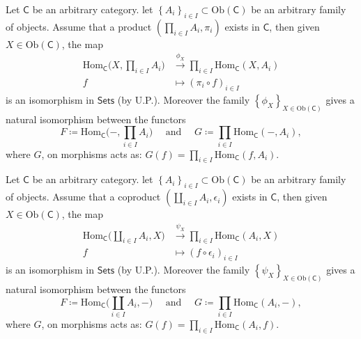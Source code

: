 \begin{prop}
	Let $\mathsf{C}$ be an arbitrary category.
	let $\left\{ A_i \right\}_{i \in I} \subset \mathrm{Ob} \left(\mathsf{C}\right)$ be an arbitrary family of objects.
	Assume that a product $\left(\prod_{i \in I}A_i, \pi_i\right)$ exists in $\mathsf{C}$, then
	given $X \in \mathrm{Ob} \left(\mathsf{C}\right)$, the map
	\begin{align}
		\mathrm{Hom}_{\mathsf{C}} \bigg( X, \prod_{i \in I}A_i \bigg)  &\xrightarrow{\phi_X} \prod_{i \in I} \mathrm{Hom}_{\mathsf{C}} \left( X, A_i \right) \\
		f &\mapsto \left( \pi_i \circ f \right)_{i \in I}
	\end{align} 
	is an isomorphism in $\mathsf{Sets}$ (by U.P.).
	Moreover the family $\left\{ \phi_X \right\}_{X \in \mathrm{Ob} \left(\mathsf{C}\right)}$ gives a natural isomorphism between the functors
	\begin{equation}
	F \coloneqq \mathrm{Hom}_{\mathsf{C}} \bigg( -, \prod_{i \in I} A_i \bigg) \quad \text{ and } \quad G\coloneqq \prod_{i \in I} \mathrm{Hom}_{\mathsf{C}} \left( -, A_i \right)
	,\end{equation} 
	where $G$, on morphisms acts as: $G(f) = \prod_{i \in I} \mathrm{Hom}_{\mathsf{C}} \left( f, A_i \right)$.
\end{prop} 

\begin{prop}
	Let $\mathsf{C}$ be an arbitrary category.
	let $\left\{ A_i \right\}_{i \in I} \subset \mathrm{Ob} \left(\mathsf{C}\right)$ be an arbitrary family of objects.
	Assume that a coproduct $\left(\coprod_{i \in I}A_i, \epsilon_i\right)$ exists in $\mathsf{C}$, then
	given $X \in \mathrm{Ob} \left(\mathsf{C}\right)$, the map
	\begin{align}
		\mathrm{Hom}_{\mathsf{C}} \bigg( \coprod_{i \in I}A_i, X \bigg)  &\xrightarrow{\psi_X} \prod_{i \in I} \mathrm{Hom}_{\mathsf{C}} \left( A_i, X \right) \\
		f &\mapsto \left( f \circ \epsilon_i \right)_{i \in I}
	\end{align} 
	is an isomorphism in $\mathsf{Sets}$ (by U.P.).
	Moreover the family $\left\{ \psi_X \right\}_{X \in \mathrm{Ob} \left(\mathsf{C}\right)}$ gives a natural isomorphism between the functors
	\begin{equation}
	F \coloneqq \mathrm{Hom}_{\mathsf{C}} \bigg( \coprod_{i \in I} A_i, - \bigg) \quad \text{ and } \quad G\coloneqq \prod_{i \in I} \mathrm{Hom}_{\mathsf{C}} \left( A_i, - \right)
	,\end{equation} 
	where $G$, on morphisms acts as: $G(f) = \prod_{i \in I} \mathrm{Hom}_{\mathsf{C}} \left( A_i, f \right)$.
\end{prop} 

